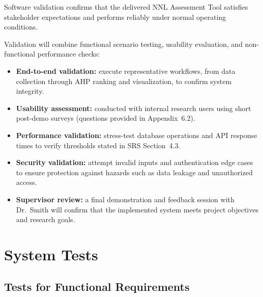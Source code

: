 \documentclass[12pt, titlepage]{article}
\begin{document}

Software validation confirms that the delivered NNL Assessment Tool satisfies
stakeholder expectations and performs reliably under normal operating
conditions.

Validation will combine functional scenario testing, usability evaluation, and
non-functional performance checks:

\begin{itemize}
  \item \textbf{End-to-end validation:} execute representative workflows, from
  data collection through AHP ranking and visualization, to confirm system
  integrity.

  \item \textbf{Usability assessment:} conducted with internal research users
  using short post-demo surveys (questions provided in Appendix~6.2).

  \item \textbf{Performance validation:} stress-test database operations and API
  response times to verify thresholds stated in SRS Section~4.3.

  \item \textbf{Security validation:} attempt invalid inputs and authentication
  edge cases to ensure protection against hazards such as data leakage and
  unauthorized access.

  \item \textbf{Supervisor review:} a final demonstration and feedback session
  with Dr.~Smith will confirm that the implemented system meets project
  objectives and research goals.
\end{itemize}

\section{System Tests}


\subsection{Tests for Functional Requirements}

\end{document}
